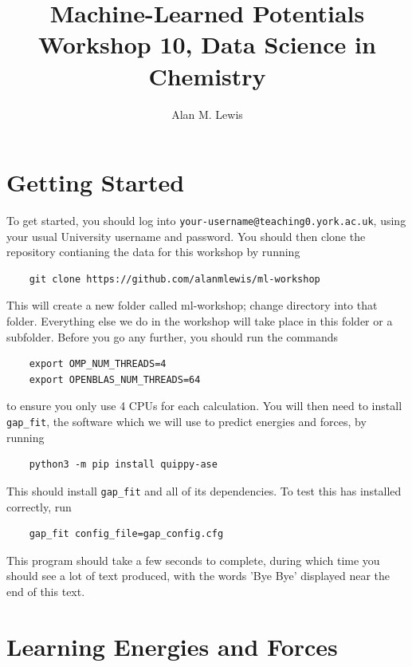 \documentclass{article}
\title{Machine-Learned Potentials \\ Workshop 10, Data Science in Chemistry}
\author{Alan M. Lewis}
\date{}
\begin{document}
\maketitle

\section{Getting Started}

To get started, you should log into \verb|your-username@teaching0.york.ac.uk|, using your usual University username and password. You should then clone the repository contianing the data for this workshop by running
\begin{Verbatim}
    git clone https://github.com/alanmlewis/ml-workshop
\end{Verbatim}
This will create a new folder called ml-workshop; change directory into that folder. Everything else we do in the workshop will take place in this folder or a subfolder. Before you go any further, you should run the commands
\begin{Verbatim}
    export OMP_NUM_THREADS=4
    export OPENBLAS_NUM_THREADS=64
\end{Verbatim}
to ensure you only use 4 CPUs for each calculation. You will then need to install \verb|gap_fit|, the software which we will use to predict energies and forces, by running
\begin{Verbatim}
    python3 -m pip install quippy-ase
\end{Verbatim}
This should install \verb|gap_fit| and all of its dependencies. To test this has installed correctly, run
\begin{Verbatim}
    gap_fit config_file=gap_config.cfg
\end{Verbatim}
This program should take a few seconds to complete, during which time you should see a lot of text produced, with the words 'Bye Bye' displayed near the end of this text.

\section{Learning Energies and Forces}
\end{document}
